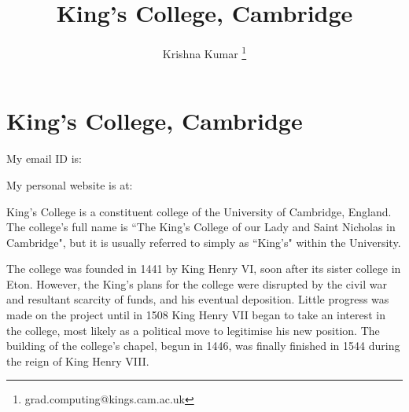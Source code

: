 \documentclass{report}
\title{King's College, Cambridge}
\author{Krishna Kumar \thanks{grad.computing@kings.cam.ac.uk}}
\begin{document}
\maketitle
\listoffigures
\clearpage

\section{King's College, Cambridge}



My email ID is: %

My personal website is at: %

King's College is a constituent college of the University of Cambridge, England. The college's full name is ``The King's College of our Lady and Saint Nicholas in Cambridge", but it is usually referred to simply as ``King's" within the University.

The college was founded in 1441 by King Henry VI, soon after its sister college in Eton. However, the King's plans for the college were disrupted by the civil war and resultant scarcity of funds, and his eventual deposition. Little progress was made on the project until in 1508 King Henry VII began to take an interest in the college, most likely as a political move to legitimise his new position. The building of the college's chapel, begun in 1446, was finally finished in 1544 during the reign of King Henry VIII.


\end{document}
